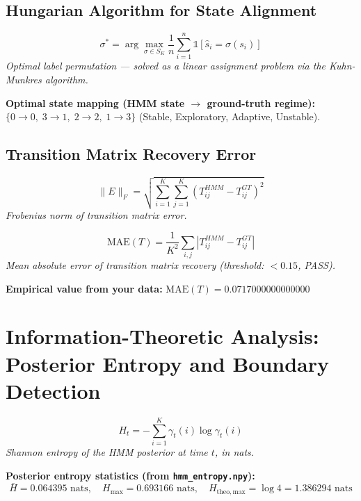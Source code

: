 \documentclass[12pt]{article}
\begin{document}
\subsection{Hungarian Algorithm for State Alignment}

\begin{equation}
\sigma^* = \arg\max_{\sigma \in S_K}\frac{1}{n}\sum_{i=1}^{n}\mathbb{1}[\hat{s}_i = \sigma(s_i)]
\end{equation}
\noindent\textit{Optimal label permutation — solved as a linear assignment problem via the Kuhn-Munkres algorithm.}


\noindent\textbf{Optimal state mapping (HMM state $\to$ ground-truth regime):} $\{0\to 0,\; 3\to 1,\; 2\to 2,\; 1\to 3\}$ (Stable, Exploratory, Adaptive, Unstable).



\subsection{Transition Matrix Recovery Error}

\begin{equation}
\|E\|_F = \sqrt{\sum_{i=1}^{K}\sum_{j=1}^{K}(T^{HMM}_{ij} - T^{GT}_{ij})^2}
\end{equation}
\noindent\textit{Frobenius norm of transition matrix error.}


\begin{equation}
\mathrm{MAE}(T) = \frac{1}{K^2}\sum_{i,j}|T^{HMM}_{ij} - T^{GT}_{ij}|
\end{equation}
\noindent\textit{Mean absolute error of transition matrix recovery (threshold: $< 0.15$, PASS).}

\noindent\textbf{Empirical value from your data:} $\mathrm{MAE}(T) = 0.0717000000000000$



\section{Information-Theoretic Analysis: Posterior Entropy and Boundary Detection}

\begin{equation}
H_t = -\sum_{i=1}^{K}\gamma_t(i)\log\gamma_t(i)
\end{equation}
\noindent\textit{Shannon entropy of the HMM posterior at time $t$, in nats.}


\noindent\textbf{Posterior entropy statistics (from \texttt{hmm\_entropy.npy}):}
\begin{equation}
\bar{H} = 0.064395\text{ nats}, \quad H_{\max} = 0.693166\text{ nats}, \quad H_{\mathrm{theo,max}} = \log 4 = 1.386294\text{ nats}
\end{equation}
\end{document}
